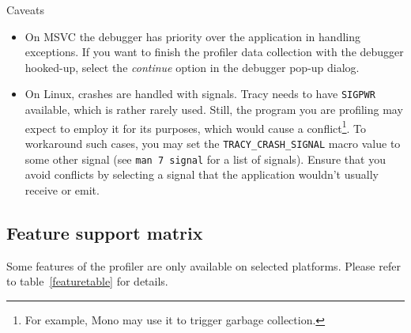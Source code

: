 \documentclass[hidelinks,titlepage,a4paper,twoside]{article}
\begin{document}
\begin{bclogo}[
noborder=true,
couleur=black!5,
logo=\bcattention
]{Caveats}
\begin{itemize}
\item On MSVC the debugger has priority over the application in handling exceptions. If you want to finish the profiler data collection with the debugger hooked-up, select the \emph{continue} option in the debugger pop-up dialog.
\item On Linux, crashes are handled with signals. Tracy needs to have \texttt{SIGPWR} available, which is rather rarely used. Still, the program you are profiling may expect to employ it for its purposes, which would cause a conflict\footnote{For example, Mono may use it to trigger garbage collection.}. To workaround such cases, you may set the \texttt{TRACY\_CRASH\_SIGNAL} macro value to some other signal (see \texttt{man 7 signal} for a list of signals). Ensure that you avoid conflicts by selecting a signal that the application wouldn't usually receive or emit.
\end{itemize}
\end{bclogo}

\subsection{Feature support matrix}
\label{featurematrix}

Some features of the profiler are only available on selected platforms. Please refer to table~\ref{featuretable} for details.
\end{document}
